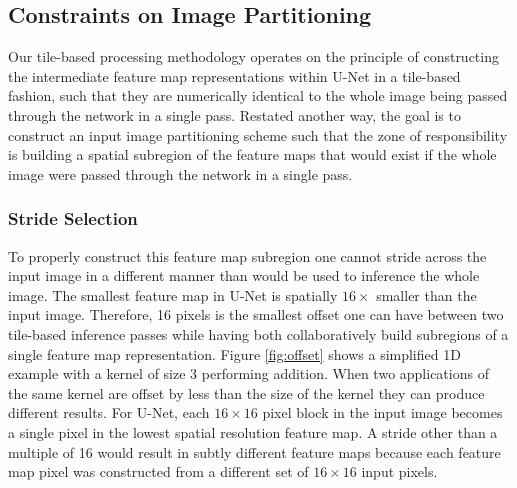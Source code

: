 \documentclass[letterpaper]{article} %
\begin{document}
\subsection{Constraints on Image Partitioning}

Our tile-based processing methodology operates on the principle of constructing the intermediate feature map representations within U-Net in a tile-based fashion, such that they are numerically identical to the whole image being passed through the network in a single pass. Restated another way, the goal is to construct an input image partitioning scheme such that the zone of responsibility is building a spatial subregion of the feature maps that would exist if the whole image were passed through the network in a single pass. 

\subsubsection{Stride Selection}
To properly construct this feature map subregion one cannot stride across the input image in a different manner than would be used to inference the whole image. The smallest feature map in U-Net is spatially $16 \times$ smaller than the input image. Therefore, 16 pixels is the smallest offset one can have between two tile-based inference passes while having both collaboratively build subregions of a single feature map representation. Figure \ref{fig:offset} shows a simplified 1D example with a kernel of size 3 performing addition. When two applications of the same kernel are offset by less than the size of the kernel they can produce different results. 
For U-Net, each $16 \times 16$ pixel block in the input image becomes a single pixel in the lowest spatial resolution feature map. A stride other than a multiple of 16 would result in subtly different feature maps because each feature map pixel was constructed from a different set of $16 \times 16$ input pixels. 

\end{document}
